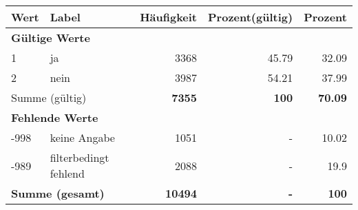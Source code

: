      \begin{longtable}{lXrrr}
     \toprule
     \textbf{Wert} & \textbf{Label} & \textbf{Häufigkeit} & \textbf{Prozent(gültig)} & \textbf{Prozent} \\
     \endhead
     \midrule
     \multicolumn{5}{l}{\textbf{Gültige Werte}}\\

     1 &
     \multicolumn{1}{X}{ ja   } &


       \num{3368} &
       \num[round-mode=places,round-precision=2]{45,79} &
         \num[round-mode=places,round-precision=2]{32,09} \\

     2 &
     \multicolumn{1}{X}{ nein   } &


       \num{3987} &
       \num[round-mode=places,round-precision=2]{54,21} &
         \num[round-mode=places,round-precision=2]{37,99} \\
     \midrule
     \multicolumn{2}{l}{Summe (gültig)} &
       \textbf{\num{7355}} &
     \textbf{100} &
       \textbf{\num[round-mode=places,round-precision=2]{70,09}} \\
     \multicolumn{5}{l}{\textbf{Fehlende Werte}}\\
       -998 &
       keine Angabe &
         \num{1051} &
        - &
         \num[round-mode=places,round-precision=2]{10,02} \\
       -989 &
       filterbedingt fehlend &
         \num{2088} &
        - &
         \num[round-mode=places,round-precision=2]{19,9} \\
     \midrule
     \multicolumn{2}{l}{\textbf{Summe (gesamt)}} &
          \textbf{\num{10494}} &
        \textbf{-} &
        \textbf{100} \\
     \bottomrule
     \end{longtable}
     
